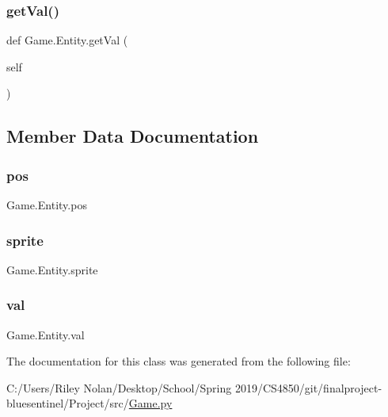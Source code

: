 \mbox{\label{class_game_1_1_entity_a0ffc20b9c7f3f72996bf288525670495}} 
\subsubsection{\texorpdfstring{getVal()}{getVal()}}
{\footnotesize\ttfamily def Game.\+Entity.\+get\+Val (\begin{DoxyParamCaption}\item[{}]{self }\end{DoxyParamCaption})}



\subsection{Member Data Documentation}
\mbox{\label{class_game_1_1_entity_a982b731c21081324b5809d7a88781b43}} 
\subsubsection{\texorpdfstring{pos}{pos}}
{\footnotesize\ttfamily Game.\+Entity.\+pos}

\mbox{\label{class_game_1_1_entity_ac8064353c61c836135c530e8fc77842b}} 
\subsubsection{\texorpdfstring{sprite}{sprite}}
{\footnotesize\ttfamily Game.\+Entity.\+sprite}

\mbox{\label{class_game_1_1_entity_a8b3f35125800487471a405ff0ad69e77}} 
\subsubsection{\texorpdfstring{val}{val}}
{\footnotesize\ttfamily Game.\+Entity.\+val}



The documentation for this class was generated from the following file\+:\begin{DoxyCompactItemize}
\item 
C\+:/\+Users/\+Riley Nolan/\+Desktop/\+School/\+Spring 2019/\+C\+S4850/git/finalproject-\/bluesentinel/\+Project/src/\mbox{\hyperlink{_game_8py}{Game.\+py}}\end{DoxyCompactItemize}
